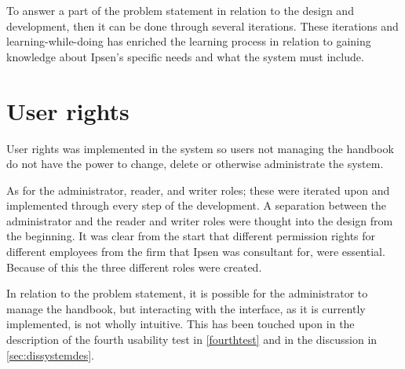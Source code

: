 To answer a part of the problem statement in relation to the design and development, then it can be done through several iterations.
These iterations and learning-while-doing has enriched the learning process in relation to gaining knowledge about Ipsen's specific needs and what the system must include.

\section{User rights}
User rights was implemented in the system so users not managing the handbook do not have the power to change, delete or otherwise administrate the system.

As for the administrator, reader, and writer roles; these were iterated upon and implemented through every step of the development.
A separation between the administrator and the reader and writer roles were thought into the design from the beginning.
It was clear from the start that different permission rights for different employees from the firm that Ipsen was consultant for, were essential.
Because of this the three different roles were created.

In relation to the problem statement, it is possible for the administrator to manage the handbook, but interacting with the interface, as it is currently implemented, is not wholly intuitive.
This has been touched upon in the description of the fourth usability test in \cref{fourthtest} and in the discussion in \cref{sec:dissystemdes}.
